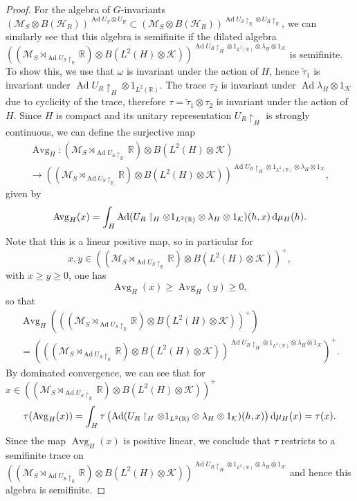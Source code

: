 \documentclass[sn-mathphys-num]{sn-jnl}%
\newcommand{\RR}{\mathbb{R}}
\newcommand{\HH}{\mathcal{H}}
\newcommand{\KK}{\mathcal{K}}
\newcommand{\MM}{\mathcal{M}}
\DeclareMathOperator{\Ad}{Ad}
\newcommand{\diff}{\textup{d}}
\numberwithin{equation}{section}
\theoremstyle{thmstyleone}%
\theoremstyle{thmstyletwo}%
\theoremstyle{thmstylethree}%
\begin{document}
\begin{proof}
    For the algebra of $G$-invariants $(\MM_S\otimes B(\HH_R))^{\Ad U_S\otimes U_R}\subset (\MM_S\otimes B(\HH_R))^{\Ad U_S\restriction_\RR\otimes U_R\restriction_\RR}$, we can similarly see that this algebra is semifinite if the dilated algebra $((\MM_S\rtimes_{\Ad U_S\restriction_\RR}\RR)\otimes B(L^2(H)\otimes\KK))^{\Ad U_R\restriction_H\otimes 1_{L^2(\RR)}\otimes \lambda_H\otimes 1_\KK}$ is semifinite. To show this, we use that $\omega$ is invariant under the action of $H$, hence $\tilde{\tau}_1$ is invariant under $\Ad U_R\restriction_H\otimes 1_{L^2(\RR)}$. The trace $\tau_2$ is invariant under $\Ad \lambda_H\otimes 1_\KK$ due to cyclicity of the trace, therefore $\tau=\tilde{\tau}_1\otimes\tau_2$ is invariant under the action of $H$. Since $H$ is compact and its unitary representation $U_R\restriction_H$ is strongly continuous, we can define the surjective map 
    \begin{multline}
        \operatorname{Avg}_H:(\MM_S\rtimes_{\Ad U_S\restriction_\RR}\RR)\otimes B(L^2(H)\otimes\KK)\\\to((\MM_S\rtimes_{\Ad U_S\restriction_\RR}\RR)\otimes B(L^2(H)\otimes\KK))^{\Ad U_R\restriction_H\otimes 1_{L^2(\RR)}\otimes \lambda_H\otimes 1_\KK},
    \end{multline}
    given by
    \begin{equation}
        \operatorname{Avg}_H(x)=\int_H \Ad (U_R\restriction_H\otimes 1_{L^2(\RR)}\otimes \lambda_H\otimes 1_\KK)(h,x)\,\diff\mu_H(h).
    \end{equation}
    Note that this is a linear positive map, so in particular for \begin{equation}
        x,y\in ((\MM_S\rtimes_{\Ad U_S\restriction_\RR}\RR)\otimes B(L^2(H)\otimes\KK))^+,
    \end{equation}  with $x\geq y\geq 0$, one has
    \begin{equation}
        \operatorname{Avg}_H(x)\geq\operatorname{Avg}_H(y)\geq 0,
    \end{equation}
    so that 
    \begin{multline}
        \operatorname{Avg}_H(((\MM_S\rtimes_{\Ad U_S\restriction_\RR}\RR)\otimes B(L^2(H)\otimes\KK))^+)\\=\left(((\MM_S\rtimes_{\Ad U_S\restriction_\RR}\RR)\otimes B(L^2(H)\otimes\KK))^{\Ad U_R\restriction_H\otimes 1_{L^2(\RR)}\otimes \lambda_H\otimes 1_\KK}\right)^+. 
    \end{multline}
    By dominated convergence, we can see that for $x\in ((\MM_S\rtimes_{\Ad U_S\restriction_\RR}\RR)\otimes B(L^2(H)\otimes\KK))^+$
    \begin{equation}
        \tau(\operatorname{Avg}_H(x))=\int_H \tau\left(\Ad (U_R\restriction_H\otimes 1_{L^2(\RR)}\otimes \lambda_H\otimes 1_\KK)(h,x)\right)\diff\mu_H(x)=\tau(x).
    \end{equation}
    Since the map $\operatorname{Avg}_H(x)$ is positive linear, we conclude that $\tau$ restricts to a semifinite trace on  $((\MM_S\rtimes_{\Ad U_S\restriction_\RR}\RR)\otimes B(L^2(H)\otimes\KK))^{\Ad U_R\restriction_H\otimes 1_{L^2(\RR)}\otimes \lambda_H\otimes 1_\KK}$ and hence this algebra is semifinite.
    

\end{proof}
\end{document}
